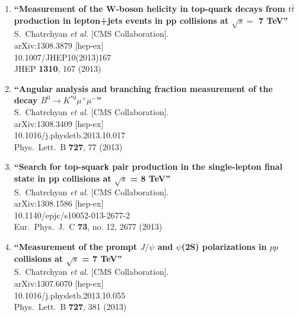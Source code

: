 \documentclass{article}
\begin{document}
\begin{enumerate}
\item%
{\bf ``Measurement of the W-boson helicity in top-quark decays from $t\bar{t}$ production in lepton+jets events in pp collisions at $\sqrt{s} =$ 7 TeV''}
  \\{}S.~Chatrchyan {\it et al.}  [CMS Collaboration].
  \\{}arXiv:1308.3879 [hep-ex]
    \\{}10.1007/JHEP10(2013)167
\\{}JHEP {\bf 1310}, 167 (2013) %


\item%
{\bf ``Angular analysis and branching fraction measurement of the decay $B^0 \to K^{*0} \mu^+\mu^-$''}
  \\{}S.~Chatrchyan {\it et al.}  [CMS Collaboration].
  \\{}arXiv:1308.3409 [hep-ex]
    \\{}10.1016/j.physletb.2013.10.017
\\{}Phys.\ Lett.\ B {\bf 727}, 77 (2013) %


\item%
{\bf ``Search for top-squark pair production in the single-lepton final state in pp collisions at $\sqrt{s}$ = 8 TeV''}
  \\{}S.~Chatrchyan {\it et al.}  [CMS Collaboration].
  \\{}arXiv:1308.1586 [hep-ex]
    \\{}10.1140/epjc/s10052-013-2677-2
\\{}Eur.\ Phys.\ J.\ C {\bf 73}, no. 12, 2677 (2013) %


\item%
{\bf ``Measurement of the prompt $J/\psi$ and $\psi$(2S) polarizations in $pp$ collisions at $\sqrt{s}$ = 7 TeV''}
  \\{}S.~Chatrchyan {\it et al.}  [CMS Collaboration].
  \\{}arXiv:1307.6070 [hep-ex]
    \\{}10.1016/j.physletb.2013.10.055
\\{}Phys.\ Lett.\ B {\bf 727}, 381 (2013) %



\end{enumerate}
\end{document}
